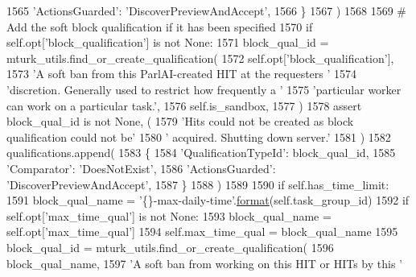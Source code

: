 \begin{DoxyCode}
1565                     \textcolor{stringliteral}{'ActionsGuarded'}: \textcolor{stringliteral}{'DiscoverPreviewAndAccept'},
1566                 \}
1567             )
1568 
1569         \textcolor{comment}{# Add the soft block qualification if it has been specified}
1570         \textcolor{keywordflow}{if} self.opt[\textcolor{stringliteral}{'block\_qualification'}] \textcolor{keywordflow}{is} \textcolor{keywordflow}{not} \textcolor{keywordtype}{None}:
1571             block\_qual\_id = mturk\_utils.find\_or\_create\_qualification(
1572                 self.opt[\textcolor{stringliteral}{'block\_qualification'}],
1573                 \textcolor{stringliteral}{'A soft ban from this ParlAI-created HIT at the requesters '}
1574                 \textcolor{stringliteral}{'discretion. Generally used to restrict how frequently a '}
1575                 \textcolor{stringliteral}{'particular worker can work on a particular task.'},
1576                 self.is\_sandbox,
1577             )
1578             \textcolor{keyword}{assert} block\_qual\_id \textcolor{keywordflow}{is} \textcolor{keywordflow}{not} \textcolor{keywordtype}{None}, (
1579                 \textcolor{stringliteral}{'Hits could not be created as block qualification could not be'}
1580                 \textcolor{stringliteral}{' acquired. Shutting down server.'}
1581             )
1582             qualifications.append(
1583                 \{
1584                     \textcolor{stringliteral}{'QualificationTypeId'}: block\_qual\_id,
1585                     \textcolor{stringliteral}{'Comparator'}: \textcolor{stringliteral}{'DoesNotExist'},
1586                     \textcolor{stringliteral}{'ActionsGuarded'}: \textcolor{stringliteral}{'DiscoverPreviewAndAccept'},
1587                 \}
1588             )
1589 
1590         \textcolor{keywordflow}{if} self.has\_time\_limit:
1591             block\_qual\_name = \textcolor{stringliteral}{'\{\}-max-daily-time'}.\hyperlink{namespaceparlai_1_1chat__service_1_1services_1_1messenger_1_1shared__utils_a32e2e2022b824fbaf80c747160b52a76}{format}(self.task\_group\_id)
1592             \textcolor{keywordflow}{if} self.opt[\textcolor{stringliteral}{'max\_time\_qual'}] \textcolor{keywordflow}{is} \textcolor{keywordflow}{not} \textcolor{keywordtype}{None}:
1593                 block\_qual\_name = self.opt[\textcolor{stringliteral}{'max\_time\_qual'}]
1594             self.max\_time\_qual = block\_qual\_name
1595             block\_qual\_id = mturk\_utils.find\_or\_create\_qualification(
1596                 block\_qual\_name,
1597                 \textcolor{stringliteral}{'A soft ban from working on this HIT or HITs by this '}

\end{DoxyCode}
